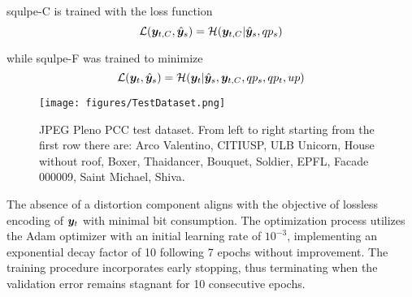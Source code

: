 \gls{squlpe}-C is trained with the loss function
\begin{equation}
    \mathcal{L}(\y_{t, C}, \hat{\y}_s )= \mathcal{H}(\y_{t, C}|\hat{\y}_s, qp_s)
\end{equation}

while \gls{squlpe}-F was trained to minimize
\begin{equation}
\mathcal{L}(\y_{t}, \hat{\y}_s) = \mathcal{H}(\y_{t}|\hat{\y}_s, \y_{t, C}, qp_s, qp_t, up)
\end{equation}

\begin{figure*}[!t]
    \centering
    \texttt{[image: figures/TestDataset.png]}
    \caption{JPEG Pleno PCC test dataset. From left to right starting from the first row there are: Arco Valentino, CITIUSP, ULB Unicorn, House without roof, Boxer, Thaidancer, Bouquet, Soldier, EPFL, Facade 000009, Saint Michael, Shiva.}
    \label{fig:test_data}
\end{figure*}

The absence of a distortion component aligns with the objective of lossless encoding of $\y_t$ with minimal bit consumption. The optimization process utilizes the Adam optimizer with an initial learning rate of $10^{-3}$, implementing an exponential decay factor of 10 following 7 epochs without improvement. The training procedure incorporates early stopping, thus terminating when the validation error remains stagnant for 10 consecutive epochs.